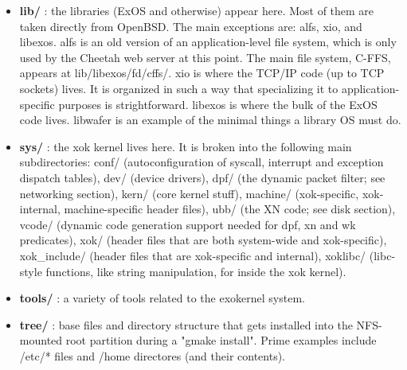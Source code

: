 \begin{itemize}
\item {\bf lib/} : the libraries (ExOS and otherwise) appear here.  Most
of them are taken directly from OpenBSD.  The main exceptions are: alfs,
xio, and libexos.  alfs is an old version of an application-level file
system, which is only used by the Cheetah web server at this point.  The
main file system, C-FFS, appears at lib/libexos/fd/cffs/.  xio is where
the TCP/IP code (up to TCP sockets) lives.  It is organized in such a way
that specializing it to application-specific purposes is strightforward.
libexos is where the bulk of the ExOS code lives.  libwafer is an example
of the minimal things a library OS must do.

\item {\bf sys/} : the xok kernel lives here.  It is broken into the following
main subdirectories: conf/ (autoconfiguration of syscall, interrupt and
exception dispatch tables), dev/ (device drivers), dpf/ (the dynamic packet
filter; see networking section), kern/ (core kernel stuff), machine/
(xok-specific, xok-internal, machine-specific header files),
ubb/ (the XN code; see disk section), vcode/ (dynamic code generation
support needed for dpf, xn and wk predicates), xok/ (header files that are
both system-wide and xok-specific), xok\_include/ (header files that are
xok-specific and internal), xoklibc/ (libc-style functions, like string
manipulation, for inside the xok kernel).

\item {\bf tools/} : a variety of tools related to the exokernel system.

\item {\bf tree/} : base files and directory structure that gets installed
into the NFS-mounted root partition during a "gmake install".  Prime
examples include /etc/* files and /home directores (and their contents).

\end{itemize}

